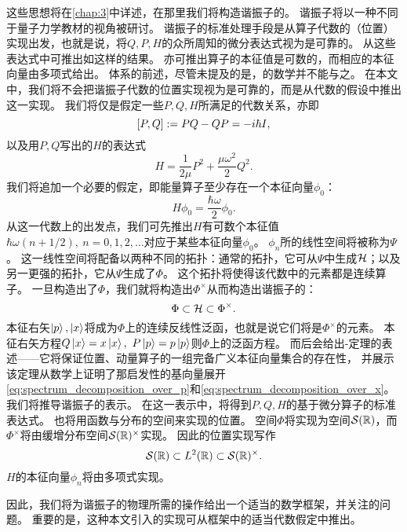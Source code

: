 这些思想将在\cref{chap:3}中详述，在那里我们将构造谐振子的\rhs。
谐振子将以一种不同于量子力学教材的视角被研讨。
谐振子的标准处理手段是从算子代数的（位置）\schrodinger 实现出发，也就是说，将\(Q,P,H\)的众所周知的微分表达式视为是可靠的。
从这些表达式中可推出如\ccr 这样的结果。
亦可推出\hamilton 算子的本征值是可数的，而相应的本征向量由\hermite 多项式给出。
\dirac 体系的前述，尽管未提及的是，\hs 的数学并不能与之。
在本文中，我们将不会把谐振子代数的位置实现视为是可靠的，而是从代数的假设中推出这一实现。
我们将仅是假定一些\(P,Q,H\)所满足的代数关系，亦即\ccr
\[\left[P,Q\right]:=PQ-QP=-i\hbar I,\]
以及用\(P,Q\)写出的\(H\)的表达式
\[H=\frac{1}{2\mu}P^2+\frac{\mu\omega^2}{2}Q^2.\]
我们将追加一个必要的假定，即能量算子至少存在一个本征向量\(\phi_0\)：
\[H\phi_0=\frac{\hbar\omega}{2}\phi_0.\]
从这一代数上的出发点，我们可先推出\(H\)有可数个本征值\(\hbar\omega(n+1/2),\ n=0,1,2,\dots\)对应于某些本征向量\(\phi_0\)。
\(\phi_n\)所的线性空间将被称为\(\Psi\)。
这一线性空间将配备以两种不同的拓扑：通常的\hs 拓扑，它可从\(\Psi\)中生成\(\mathcal H\)；以及另一更强的拓扑，它从\(\Psi\)生成了\(\Phi\)。
这个\nuclear 拓扑将使得该代数中的元素都是连续算子。
一旦构造出了\(\Phi\)，我们就将构造出\(\Phi^\times\)从而构造出谐振子的\rhs：
\[\label{eq:gelfand_triplet_2}
	\Phi\subset\mathcal H\subset\Phi^\times.\]
本征右矢\(\ket p,\ket x\)将成为\(\Phi\)上的连续反线性泛函，也就是说它们将是\(\Phi^\times\)的元素。
本征右矢方程\(Q\ket x=x\ket x,\ P\ket p=p\ket p\)则\(\Phi\)上的泛函方程。
而后会给出\gelfand-\maurin 定理的表述——它将保证位置、动量算子的一组完备广义本征向量集合的存在性，
并展示该定理从数学上证明了那启发性的\dirac 基向量展开\cref{eq:spectrum_decomposition_over_p}和\cref{eq:spectrum_decomposition_over_x}。
我们将推导谐振子的\schrodinger 表示。
在这一表示中，将得到\(P,Q,H\)的基于微分算子的标准表达式。
也将用函数与分布的空间来实现的位置。
空间\(\Phi\)将实现为\schwartz 空间\(\mathcal S(\mathbb R)\)，而\(\Phi^\times\)将由缓增分布空间\(\mathcal S(\mathbb R)^\times\)实现。
因此的位置实现写作
\[\mathcal S(\mathbb R)\subset L^2(\mathbb R)\subset\mathcal S(\mathbb R)^\times.\]
\(H\)的本征向量\(\phi_n\)将由\hermite 多项式实现。

因此，我们将为谐振子的物理所需的操作给出一个适当的数学框架，并关注的问题。
重要的是，这种本文\emph{}引入的实现可从\RHS 框架中的适当代数假定中推出。

